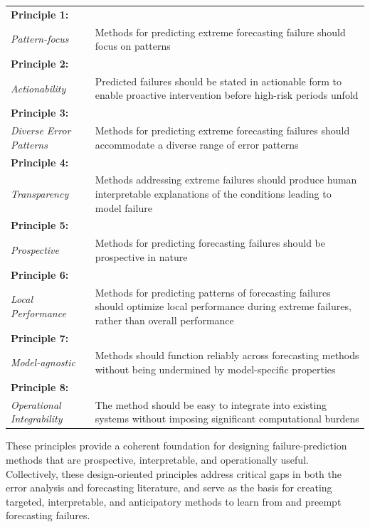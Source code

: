 \documentclass[]{interact}
\theoremstyle{plain}
\theoremstyle{definition}
\theoremstyle{remark}
\begin{document}
\begin{table}
{\begin{tabular}{m{2.3cm}m{11.2cm}} \toprule
\centering\textbf{Principle 1:} \\ \centering\textit{Pattern-focus} & Methods for predicting extreme forecasting failure should focus on patterns \\
\midrule
\centering\textbf{Principle 2:} \\ \centering\textit{Actionability} & Predicted failures should be stated in actionable form to enable proactive intervention before high-risk periods unfold \\
\midrule
\centering\textbf{Principle 3:} \\ \centering\textit{Diverse Error Patterns} & Methods for predicting extreme forecasting failures should accommodate a diverse range of error patterns \\
\midrule
\centering\textbf{Principle 4:} \\ \centering\textit{Transparency} & Methods addressing extreme failures should produce human interpretable explanations of the conditions leading to model failure \\
\midrule
\centering\textbf{Principle 5:} \\ \centering\textit{Prospective} & Methods for predicting forecasting failures should be prospective in nature \\
\midrule
\centering\textbf{Principle 6:} \\ \centering\textit{Local Performance} & Methods for predicting patterns of forecasting failures should optimize local performance during extreme failures, rather than overall performance \\
\midrule
\centering\textbf{Principle 7:} \\ \centering\textit{Model-agnostic} & Methods should function reliably across forecasting methods without being undermined by model-specific properties \\
\midrule
\centering\textbf{Principle 8:} \\ \centering\textit{Operational Integrability} & The method should be easy to integrate into existing systems without imposing significant computational burdens \\
\bottomrule
\end{tabular}}
\label{tab:principles}
\end{table}

These principles provide a coherent foundation for designing failure-prediction methods that are prospective, interpretable, and operationally useful. Collectively, these design-oriented principles address critical gaps in both the error analysis and forecasting literature, and serve as the basis for creating targeted, interpretable, and anticipatory methods to learn from and preempt forecasting failures.
\end{document}
